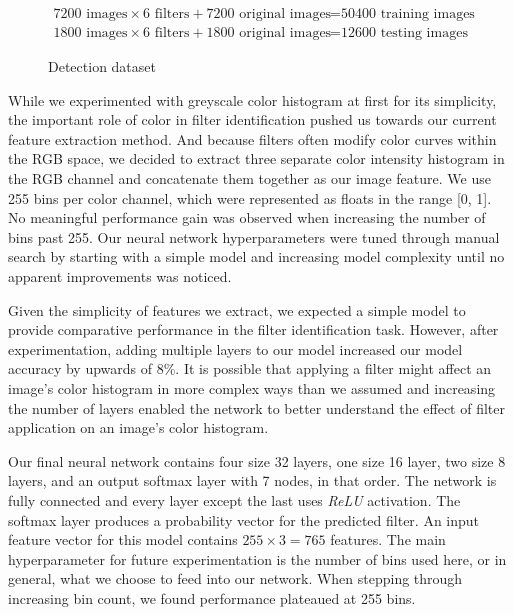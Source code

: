 \documentclass[11pt]{article}
\begin{document}
\begin{figure}[H]
    \centering
    \begin{align*}
        \text{7200 images} \times \text{6 filters} + \text{7200 original images} &= \text{50400 training images}\\
        \text{1800 images} \times \text{6 filters} + \text{1800 original images} &= \text{12600 testing images}
    \end{align*}
    \caption{Detection dataset}
    \label{fig:detection_dataset}
\end{figure}

While we experimented with greyscale color histogram at first for its simplicity, the important role of color in filter identification pushed us towards our current feature extraction method. And because filters often modify color curves within the RGB space, we decided to extract three separate color intensity histogram in the RGB channel and concatenate them together as our image feature. We use 255 bins per color channel, which were represented as floats in the range [0, 1]. No meaningful performance gain was observed when increasing the number of bins past 255. Our neural network hyperparameters were tuned through manual search by starting with a simple model and increasing model complexity until no apparent improvements was noticed.

Given the simplicity of features we extract, we expected a simple model to provide comparative performance in the filter identification task. However, after experimentation, adding multiple layers to our model increased our model accuracy by upwards of 8\%. It is possible that applying a filter might affect an image's color histogram in more complex ways than we assumed and increasing the number of layers enabled the network to better understand the effect of filter application on an image's color histogram.

Our final neural network contains four size 32 layers, one size 16 layer, two size 8 layers, and an output softmax layer with 7 nodes, in that order. The network is fully connected and every layer except the last uses \textit{ReLU} activation. The softmax layer produces a probability vector for the predicted filter. An input feature vector for this model contains $255 \times 3 = 765$ features. The main hyperparameter for future experimentation is the number of bins used here, or in general, what we choose to feed into our network. When stepping through increasing bin count, we found performance plateaued at 255 bins.
\end{document}
